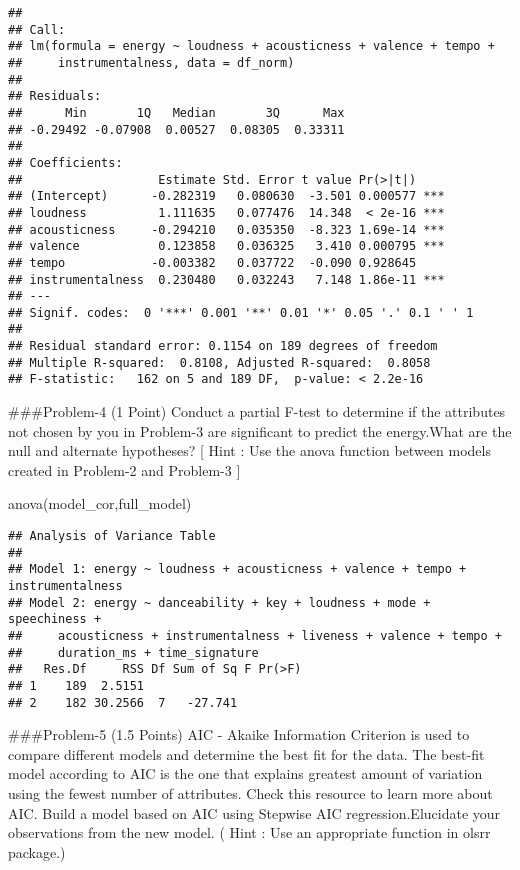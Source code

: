 \documentclass[
]{article}
\newenvironment{Shaded}{\begin{snugshade}}{\end{snugshade}}
\newcommand{\FunctionTok}[1]{\textcolor[rgb]{0.00,0.00,0.00}{#1}}
\newcommand{\NormalTok}[1]{#1}
\begin{document}
\begin{verbatim}
## 
## Call:
## lm(formula = energy ~ loudness + acousticness + valence + tempo + 
##     instrumentalness, data = df_norm)
## 
## Residuals:
##      Min       1Q   Median       3Q      Max 
## -0.29492 -0.07908  0.00527  0.08305  0.33311 
## 
## Coefficients:
##                   Estimate Std. Error t value Pr(>|t|)    
## (Intercept)      -0.282319   0.080630  -3.501 0.000577 ***
## loudness          1.111635   0.077476  14.348  < 2e-16 ***
## acousticness     -0.294210   0.035350  -8.323 1.69e-14 ***
## valence           0.123858   0.036325   3.410 0.000795 ***
## tempo            -0.003382   0.037722  -0.090 0.928645    
## instrumentalness  0.230480   0.032243   7.148 1.86e-11 ***
## ---
## Signif. codes:  0 '***' 0.001 '**' 0.01 '*' 0.05 '.' 0.1 ' ' 1
## 
## Residual standard error: 0.1154 on 189 degrees of freedom
## Multiple R-squared:  0.8108, Adjusted R-squared:  0.8058 
## F-statistic:   162 on 5 and 189 DF,  p-value: < 2.2e-16
\end{verbatim}

\#\#\#Problem-4 (1 Point) Conduct a partial F-test to determine if the
attributes not chosen by you in Problem-3 are significant to predict the
energy.What are the null and alternate hypotheses? {[} Hint : Use the
anova function between models created in Problem-2 and Problem-3 {]}

\begin{Shaded}
\begin{Highlighting}[]
\FunctionTok{anova}\NormalTok{(model\_cor,full\_model)}
\end{Highlighting}
\end{Shaded}

\begin{verbatim}
## Analysis of Variance Table
## 
## Model 1: energy ~ loudness + acousticness + valence + tempo + instrumentalness
## Model 2: energy ~ danceability + key + loudness + mode + speechiness + 
##     acousticness + instrumentalness + liveness + valence + tempo + 
##     duration_ms + time_signature
##   Res.Df     RSS Df Sum of Sq F Pr(>F)
## 1    189  2.5151                      
## 2    182 30.2566  7   -27.741
\end{verbatim}

\#\#\#Problem-5 (1.5 Points) AIC - Akaike Information Criterion is used
to compare different models and determine the best fit for the data. The
best-fit model according to AIC is the one that explains greatest amount
of variation using the fewest number of attributes. Check this resource
to learn more about AIC. Build a model based on AIC using Stepwise AIC
regression.Elucidate your observations from the new model. ( Hint : Use
an appropriate function in olsrr package.)
\end{document}
